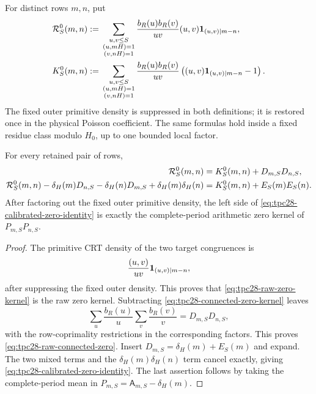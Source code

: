 For distinct rows $m,n$, put
\begin{align}
 \mathcal R_S^0(m,n)
 :={}&
 \sum_{\substack{u,v\le S\\(u,mH)=1\\(v,nH)=1}}
 \frac{b_R(u)b_R(v)}{uv}
 (u,v)\mathbf 1_{(u,v)\mid m-n},
 \label{eq:tpc28-raw-zero-kernel}\\
 K_S^0(m,n)
 :={}&
 \sum_{\substack{u,v\le S\\(u,mH)=1\\(v,nH)=1}}
 \frac{b_R(u)b_R(v)}{uv}
 \left((u,v)\mathbf 1_{(u,v)\mid m-n}-1\right).
 \label{eq:tpc28-connected-zero-kernel}
\end{align}
The fixed outer primitive density is suppressed in both definitions;
it is restored once in the physical Poisson coefficient.  The same
formulas hold inside a fixed residue class modulo $H_0$, up to one
bounded local factor.

\begin{proposition}
\label{prop:tpc28-zero-recombination}
For every retained pair of rows,
\begin{align}
 \mathcal R_S^0(m,n)&=K_S^0(m,n)+D_{m,S}D_{n,S},
 \label{eq:tpc28-raw-connected-zero}\\
 \mathcal R_S^0(m,n)
 -\delta_H(m)D_{n,S}
 -\delta_H(n)D_{m,S}
 +\delta_H(m)\delta_H(n)
 &=K_S^0(m,n)+E_S(m)E_S(n).
 \label{eq:tpc28-calibrated-zero-identity}
\end{align}
After factoring out the fixed outer primitive density, the left side
of \eqref{eq:tpc28-calibrated-zero-identity} is exactly the
complete-period arithmetic zero kernel of $P_{m,S}P_{n,S}$.
\end{proposition}

\begin{proof}
The primitive CRT density of the two target congruences is
\begin{equation}
 \frac{(u,v)}{uv}\mathbf 1_{(u,v)\mid m-n},
 \label{eq:tpc28-joint-density}
\end{equation}
after suppressing the fixed outer density.  This proves that
\eqref{eq:tpc28-raw-zero-kernel} is the raw zero kernel.  Subtracting
\eqref{eq:tpc28-connected-zero-kernel} leaves
\[
 \sum_u\frac{b_R(u)}u
 \sum_v\frac{b_R(v)}v
 =D_{m,S}D_{n,S},
\]
with the row-coprimality restrictions in the corresponding factors.
This proves \eqref{eq:tpc28-raw-connected-zero}.  Insert
$D_{m,S}=\delta_H(m)+E_S(m)$ and expand.  The two mixed terms and the
$\delta_H(m)\delta_H(n)$ term cancel exactly, giving
\eqref{eq:tpc28-calibrated-zero-identity}.  The last assertion follows
by taking the complete-period mean in
$P_{m,S}=\mathsf A_{m,S}-\delta_H(m)$.
\end{proof}

